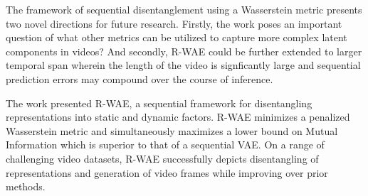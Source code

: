 \documentclass[12pt,letterpaper]{article}
\begin{document}
The framework of sequential disentanglement using a Wasserstein metric presents two novel directions for future research. Firstly, the work poses an important question of what other metrics can be utilized to capture more complex latent components in videos? And secondly, R-WAE could be further extended to larger temporal span wherein the length of the video is signficantly large and sequential prediction errors may compound over the course of inference.

The work presented R-WAE, a sequential framework for disentangling representations into static and dynamic factors. R-WAE minimizes a penalized Wasserstein metric and simultaneously maximizes a lower bound on Mutual Information which is superior to that of a sequential VAE. On a range of challenging video datasets, R-WAE successfully depicts disentangling of representations and generation of video frames while improving over prior methods.
\end{document}
